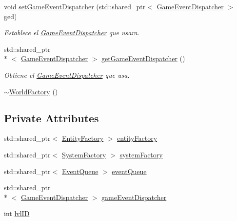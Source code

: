\begin{DoxyCompactItemize}
void \hyperlink{classant_1_1_world_factory_a22b4c9a11d6d23d57390d14d590224ca}{set\+Game\+Event\+Dispatcher} (std\+::shared\+\_\+ptr$<$ \hyperlink{classant_1_1_game_event_dispatcher}{Game\+Event\+Dispatcher} $>$ ged)
\begin{DoxyCompactList}\small\item\em Establece el \hyperlink{classant_1_1_game_event_dispatcher}{Game\+Event\+Dispatcher} que usara. \end{DoxyCompactList}\item 
std\+::shared\+\_\+ptr\\*
$<$ \hyperlink{classant_1_1_game_event_dispatcher}{Game\+Event\+Dispatcher} $>$ \hyperlink{classant_1_1_world_factory_ad33ce245eed1ba8e76ead4247d9b2724}{get\+Game\+Event\+Dispatcher} ()
\begin{DoxyCompactList}\small\item\em Obtiene el \hyperlink{classant_1_1_game_event_dispatcher}{Game\+Event\+Dispatcher} que usa. \end{DoxyCompactList}\item 
\hyperlink{classant_1_1_world_factory_a1f2b1c3f3da8c188a3c5e98144dd5527}{$\sim$\+World\+Factory} ()
\end{DoxyCompactItemize}
\subsection*{Private Attributes}
\begin{DoxyCompactItemize}
\item 
std\+::shared\+\_\+ptr$<$ \hyperlink{classant_1_1_entity_factory}{Entity\+Factory} $>$ \hyperlink{classant_1_1_world_factory_a62f10340d3a942b982eff864e7d14225}{entity\+Factory}
\item 
std\+::shared\+\_\+ptr$<$ \hyperlink{classant_1_1_system_factory}{System\+Factory} $>$ \hyperlink{classant_1_1_world_factory_adf39cbc46437aee8c7bfbf724b186d8f}{system\+Factory}
\item 
std\+::shared\+\_\+ptr$<$ \hyperlink{classant_1_1_event_queue}{Event\+Queue} $>$ \hyperlink{classant_1_1_world_factory_ab68b50b1af9f4081f9ca0a3f21905168}{event\+Queue}
\item 
std\+::shared\+\_\+ptr\\*
$<$ \hyperlink{classant_1_1_game_event_dispatcher}{Game\+Event\+Dispatcher} $>$ \hyperlink{classant_1_1_world_factory_ad340f4243d30794bd46fd87c3ccd7075}{game\+Event\+Dispatcher}
\item 
int \hyperlink{classant_1_1_world_factory_a19c196cebb24df1b5679daf87979a53f}{lvl\+I\+D}
\end{DoxyCompactItemize}


